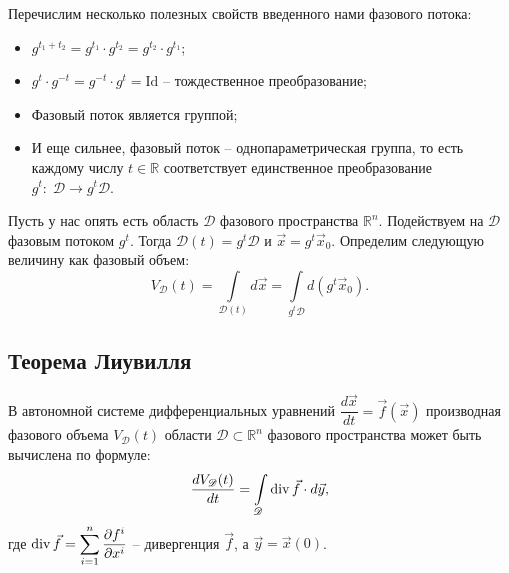 	Перечислим несколько полезных свойств введенного нами фазового потока:
	\begin{itemize}
		\item $g^{t_1 + t_2} = g^{t_1} \cdot g^{t_2} = g^{t_2} \cdot g^{t_1}$;
		
		\item $g^{t} \cdot g^{-t} = g^{-t} \cdot g^t = \text{Id}$ -- тождественное преобразование;
		
		\item Фазовый поток является группой;
		
		\item И еще сильнее, фазовый поток -- однопараметрическая группа, то есть каждому числу $t \in \mathbb{R}$ соответствует единственное преобразование $g^t: \; \mathscr{D} \rightarrow g^t \mathscr{D}$.
	\end{itemize}
	
	
	\begin{definition}
		Пусть у нас опять есть область $\mathscr{D}$ фазового пространства $\mathbb{R}^n$. Подействуем на $\mathscr{D}$ фазовым потоком $g^t$. Тогда $\mathscr{D}(t) = g^t \mathscr{D}$ и $\vec{x} = g^t \vec{x}_0$. Определим следующую величину как фазовый объем:
		\begin{equation*}
			V_\mathscr{D}(t) = \int\limits_{\mathscr{D}(t)} d\vec{x} = \int\limits_{g^t \mathscr{D}} d(g^t \vec{x}_0).
		\end{equation*}
	\end{definition}

	\subsection{Теорема Лиувилля}
	\begin{theorem}
		В автономной системе дифференциальных уравнений $\dfrac{d\vec{x}}{dt} = \vec{f}(\vec{x})$ производная фазового объема $V_\mathscr{D}(t)$ области $\mathscr{D} \subset \mathbb{R}^n$ фазового пространства может быть вычислена по формуле:
		\begin{equation*}
			\frac{dV_\mathscr{D}(t)}{dt} = \int\limits_{\mathscr{D}} \operatorname{div}\vec{f}\cdot d\vec{y},
		\end{equation*}
		где $\displaystyle \operatorname{div} \vec{f} = \sum\limits_{i = 1}^n \frac{\partial f^i}{\partial x^i}$ -- дивергенция $\vec{f}$, а $\vec{y} = \vec{x}(0)$.
	\end{theorem}

